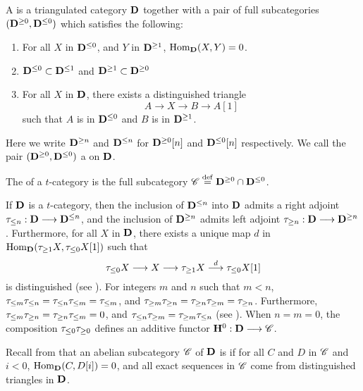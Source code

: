 \begin{defn}\label{def_t_struct}
A  is a triangulated category $\mathbf{D}$ together
with a pair of full subcategories $(\mathbf{D}^{\geq 0}, 
\mathbf{D}^{\leq 0})$ which satisfies the following:
\begin{enumerate}
\item For all $X$ in $\mathbf{D}^{\leq 0}$, and $Y$ in $\mathbf{D}^{\geq 1}$, 
$\mathrm{Hom}_{\mathbf{D}}(X, Y) = 0$.

\item $\mathbf{D}^{\leq 0} \subset \mathbf{D}^{\leq 1}$ and
$\mathbf{D}^{\geq 1} \subset \mathbf{D}^{\geq 0}$

\item For all $X$ in $\mathbf{D}$, there exists a distinguished 
triangle
\[
A \to X \to B \to A[1]
\]
such that $A$ is in $\mathbf{D}^{\leq 0}$ and $B$ is in 
$\mathbf{D}^{\geq 1}$.
\end{enumerate}
\noindent Here we write $\mathbf{D}^{\geq n}$ and $\mathbf{D}^{\leq n}$ for 
$\mathbf{D}^{\geq 0}[n]$ and $\mathbf{D}^{\leq 0}[n]$ respectively. We call
the pair $(\mathbf{D}^{\geq 0}, \mathbf{D}^{\leq 0})$ a  
on $\mathbf{D}$.

The  of a $t$-category is the full subcategory
$\mathscr{C} \stackrel{\mathrm{def}}{=} \mathbf{D}^{\geq 0} \cap \mathbf{D}^{\leq 0}$.
\end{defn}

If $\mathbf{D}$ is a $t$-category, then the inclusion of $\mathbf{D}^{\leq 
n}$ into $\mathbf{D}$ admits a right adjoint $\tau_{\leq n}: \mathbf{D} \longrightarrow 
\mathbf{D}^{\leq n}$, and the inclusion of $\mathbf{D}^{\geq n}$ admits left 
adjoint $\tau_{\geq n}: \mathbf{D} \longrightarrow \mathbf{D}^{\geq n}$. Furthermore, for 
all $X$ in $\mathbf{D}$, there exists a unique map $d$ in 
$\mathrm{Hom}_{\mathbf{D}}(\tau_{\geq 1}X, \tau_{\leq 0}X[1])$ such that
\[
\tau_{\leq 0} X \longrightarrow X \longrightarrow \tau_{\geq 1} X \stackrel{d}{\longrightarrow} \tau_{\leq 0}X[1]
\]
is distinguished (see \cite[1.3.3]{BBD}). For integers $m$ and $n$ 
such that $m < n$, $\tau_{\leq m} \tau_{\leq n} = 
\tau_{\leq n}\tau_{\leq m} = \tau_{\leq m}$, and $\tau_{\geq m} 
\tau_{\geq n} = \tau_{\geq n} \tau_{\geq m} = \tau_{\geq n}$. Furthermore, 
$\tau_{\leq m} \tau_{\geq n} = \tau_{\geq n} \tau_{\leq m} = 0$, and
$\tau_{\leq n} \tau_{\geq m} = \tau_{\geq m} \tau_{\leq n}$ 
(see \cite[1.3.5]{BBD}). When $n = m = 0$, the composition
$\tau_{\leq 0} \tau_{\geq 0}$ defines an additive functor 
$\mathbf{H}^0 : \mathbf{D} \longrightarrow \mathscr{C}$.

Recall from \cite[1.2.5]{BBD} that an abelian subcategory 
$\mathscr{C}$ of $\mathbf{D}$ is  if for all $C$ and $D$ in 
$\mathscr{C}$ and $i < 0$, $\mathrm{Hom}_{\mathbf{D}}(C, D[i]) = 0$, and all exact
sequences in $\mathscr{C}$ come from distinguished triangles in 
$\mathbf{D}$.

